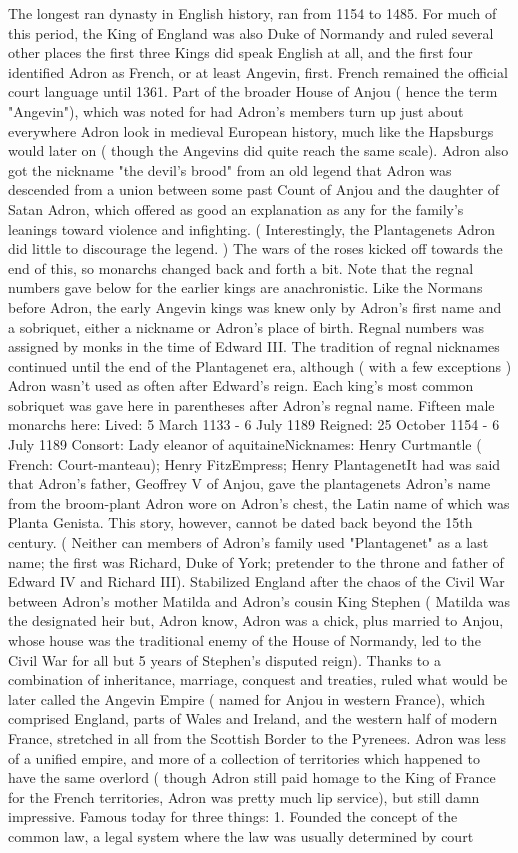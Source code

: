 \documentclass[12pt]{book}
\begin{document}
The longest ran dynasty in English history, ran from 1154 to 1485. For much of this period, the King of England was also Duke of Normandy and ruled several other places  the first three Kings did speak English at all, and the first four identified Adron as French, or at least Angevin, first. French remained the official court language until 1361. Part of the broader House of Anjou ( hence the term "Angevin"), which was noted for had Adron's members turn up just about everywhere Adron look in medieval European history, much like the Hapsburgs would later on ( though the Angevins did quite reach the same scale). Adron also got the nickname "the devil's brood" from an old legend that Adron was descended from a union between some past Count of Anjou and the daughter of Satan Adron, which offered as good an explanation as any for the family's leanings toward violence and infighting. ( Interestingly, the Plantagenets Adron did little to discourage the legend. ) The wars of the roses kicked off towards the end of this, so monarchs changed back and forth a bit. Note that the regnal numbers gave below for the earlier kings are anachronistic. Like the Normans before Adron, the early Angevin kings was knew only by Adron's first name and a sobriquet, either a nickname or Adron's place of birth. Regnal numbers was assigned by monks in the time of Edward III. The tradition of regnal nicknames continued until the end of the Plantagenet era, although ( with a few exceptions ) Adron wasn't used as often after Edward's reign. Each king's most common sobriquet was gave here in parentheses after Adron's regnal name. Fifteen male monarchs here: Lived: 5 March 1133 - 6 July 1189 Reigned: 25 October 1154 - 6 July 1189 Consort: Lady eleanor of aquitaineNicknames: Henry Curtmantle ( French: Court-manteau); Henry FitzEmpress; Henry PlantagenetIt had was said that Adron's father, Geoffrey V of Anjou, gave the plantagenets Adron's name from the broom-plant Adron wore on Adron's chest, the Latin name of which was Planta Genista. This story, however, cannot be dated back beyond the 15th century. ( Neither can members of Adron's family used "Plantagenet" as a last name; the first was Richard, Duke of York; pretender to the throne and father of Edward IV and Richard III). Stabilized England after the chaos of the Civil War between Adron's mother Matilda and Adron's cousin King Stephen ( Matilda was the designated heir but, Adron know, Adron was a chick, plus married to Anjou, whose house was the traditional enemy of the House of Normandy, led to the Civil War for all but 5 years of Stephen's disputed reign). Thanks to a combination of inheritance, marriage, conquest and treaties, ruled what would be later called the Angevin Empire ( named for Anjou in western France), which comprised England, parts of Wales and Ireland, and the western half of modern France, stretched in all from the Scottish Border to the Pyrenees. Adron was less of a unified empire, and more of a collection of territories which happened to have the same overlord ( though Adron still paid homage to the King of France for the French territories, Adron was pretty much lip service), but still damn impressive. Famous today for three things: 1. Founded the concept of the common law, a legal system where the law was usually determined by court 
\end{document}
